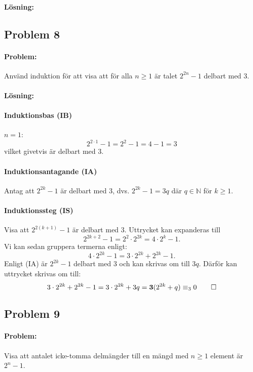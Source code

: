 \documentclass[12pt]{article}
\begin{document}
\paragraph{Lösning:}


\newpage\noindent\subsection*{Problem 8}
\paragraph{Problem:} Använd induktion för att visa att för alla $n\ge 1$ är talet $2^{2n}-1$ delbart med 3.
\paragraph{Lösning:}
\paragraph{Induktionsbas (IB)} $n=1$:
\[2^{2\cdot1}-1 = 2^2-1 = 4-1 = 3\]
vilket givetvis är delbart med 3.
\paragraph{Induktionsantagande (IA)} Antag att $2^{2k}-1$ är delbart med 3, dvs. $2^{2k}-1 = 3q$ där $q \in \mathbb{N}$ för $k\ge1.$ 

\paragraph{Induktionssteg (IS)} Visa att $2^{2(k+1)}-1$ är delbart med 3.\newline
Uttrycket kan expanderas till
\[2^{2k+2}-1 = 2^2\cdot2^{2k} = 4\cdot2^{k}-1.\]
Vi kan sedan gruppera termerna enligt:
\[4\cdot2^{2k}-1 = 3\cdot2^{2k} + 2^{2k}-1.\]
Enligt (IA) är $2^{2k}-1$ delbart med 3 och kan skrivas om till $3q$. Därför kan uttrycket skrivas om till:
\[3\cdot2^{2k} + 2^{2k}-1 = 3\cdot2^{2k} + 3q = \boldsymbol{3}(2^{2k}+q) \equiv_3 0 \qed\]

\newpage\noindent\subsection*{Problem 9}
\paragraph{Problem:} Visa att antalet icke-tomma delmängder till en mängd med \newline$n\ge 1$ element är $2^n-1$.
\end{document}
